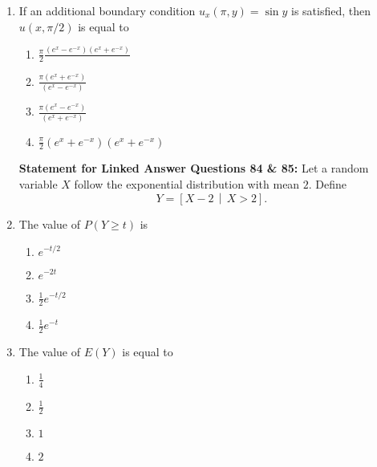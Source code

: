 \documentclass[journal,12pt,onecolumn]{IEEEtran}
\theoremstyle{remark}
\begin{document}
\begin{enumerate}
\item If an additional boundary condition \(u_x(\pi, y) = \sin y\) is satisfied, then \(u(x, \pi/2)\) is equal to
\\[-0.3em]\makebox[\textwidth][r]{\textit{[GATE EE 2025]}}

\begin{multicols}{2}
\begin{enumerate}[label=(\Alph*)]
\item \(\frac{\pi}{2} \frac{(e^x - e^{-x})(e^x + e^{-x})}{\phantom{.}}\)
\item \(\frac{\pi (e^x + e^{-x})}{(e^x - e^{-x})}\)
\item \(\frac{\pi (e^x - e^{-x})}{(e^x + e^{-x})}\)
\item \(\frac{\pi}{2} (e^x + e^{-x})(e^x + e^{-x})\)
\end{enumerate}
\end{multicols}

\textbf{Statement for Linked Answer Questions 84 \& 85:}  
Let a random variable \(X\) follow the exponential distribution with mean \(2\). Define  
\[
Y = \left[ X - 2 \,\middle|\, X > 2 \right].
\]

\item The value of \(P(Y \ge t)\) is
\\[-0.3em]\makebox[\textwidth][r]{\textit{[GATE EE 2025]}}

\begin{multicols}{2}
\begin{enumerate}[label=(\Alph*)]
\item \(e^{-t/2}\)
\item \(e^{-2t}\)
\item \(\frac{1}{2} e^{-t/2}\)
\item \(\frac{1}{2} e^{-t}\)
\end{enumerate}
\end{multicols}

\item The value of \(E(Y)\) is equal to
\\[-0.3em]\makebox[\textwidth][r]{\textit{[GATE EE 2025]}}

\begin{multicols}{2}
\begin{enumerate}[label=(\Alph*)]
\item \(\frac{1}{4}\)
\item \(\frac{1}{2}\)
\item \(1\)
\item \(2\)
\end{enumerate}
\end{multicols}

\end{enumerate}
\end{document}
